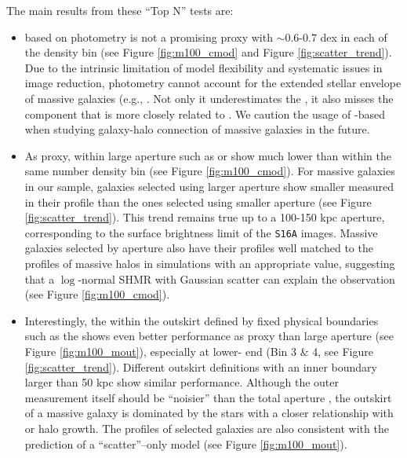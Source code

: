 \documentclass[fleqn,usenatbib,useAMS,english]{mnras}
\begin{document}
    The main results from these ``Top N'' tests are:

    \begin{itemize}

        \item \mstar{} based on \cmodel{} photometry is not a promising \mvir{} proxy with
            \sigmh{}$\sim 0.6$-0.7 dex in each of the density bin (see Figure \ref{fig:m100_cmod}
            and Figure \ref{fig:scatter_trend}).
            Due to the intrinsic limitation of model flexibility and systematic issues in
            image reduction, \cmodel{} photometry cannot account for the extended stellar
            envelope of massive galaxies (e.g., \citealt{Bernardi2013, Huang2018b}.
            Not only it underestimates the \mstar{}, it also misses the component that is
            more closely related to \mvir{}.
            We caution the usage of \cmodel{}-based \mstar{} when studying galaxy-halo
            connection of massive galaxies in the future.

        \item As \mvir{} proxy, \mstar{} within large aperture such as  or
             show much lower \sigmh{} than \mcmodel{} within the same number
            density bin (see Figure \ref{fig:m100_cmod}).
            For massive galaxies in our sample, galaxies selected using larger aperture \mstar{}
            show smaller \sigmh{} measured in their \dsigma{} profile than the ones
            selected using smaller aperture (see Figure \ref{fig:scatter_trend}).
            This trend remains true up to a 100-150 kpc aperture, corresponding to the
            surface brightness limit of the \texttt{S16A} images.
            Massive galaxies selected by aperture \mstar{} also have their \dsigma{}
            profiles well matched to the profiles of massive halos in simulations with an
            appropriate \sigmh{} value, suggesting that a $\log$-normal SHMR with Gaussian
            scatter can explain the observation (see Figure \ref{fig:m100_cmod}).

        \item Interestingly, the \mstar{} within the outskirt defined by fixed physical
            boundaries such as the  shows even better performance as
            \mvir{} proxy than large aperture \mstar{} (see Figure \ref{fig:m100_mout}),
            especially at lower-\mvir{} end (Bin 3 \& 4, see Figure \ref{fig:scatter_trend}).
            Different outskirt \mstar{} definitions with an inner boundary larger than 50 kpc
            show similar performance.
            Although the outer \mstar{} measurement itself should be ``noisier'' than the
            total aperture \mstar{}, the outskirt of a massive galaxy is dominated by
            the \exsitu{} stars with a closer relationship with \mvir{} or halo growth.
            The \dsigma{} profiles of  selected galaxies are also consistent
            with the prediction of a ``scatter''--only model (see Figure \ref{fig:m100_mout}).


\end{itemize}
\end{document}
